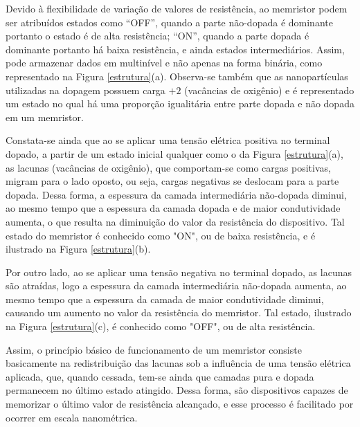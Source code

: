 \documentclass{ceel}
\begin{document}
\begin{multicols}{2}
Devido à flexibilidade de variação de valores de resistência, ao memristor podem ser atribuídos estados como “OFF”, quando a parte não-dopada é dominante portanto o estado é de alta resistência; “ON”, quando a parte dopada é dominante portanto há baixa resistência, e ainda estados intermediários. Assim, pode armazenar dados em multinível e não apenas na forma binária, como representado na Figura \ref{estrutura}(a). Observa-se também que as nanopartículas utilizadas na dopagem possuem carga $+2$ (vacâncias de oxigênio) e é representado um estado no qual há uma proporção igualitária entre parte dopada e não dopada em um memristor. 

Constata-se ainda que ao se aplicar uma tensão elétrica positiva 
no terminal dopado, a partir de um estado inicial qualquer como o da Figura \ref{estrutura}(a), as lacunas (vacâncias de oxigênio), que comportam-se como cargas positivas, migram para o lado oposto, ou seja, cargas negativas se deslocam para a parte dopada.
 Dessa forma, a espessura da camada intermediária não-dopada diminui, ao mesmo tempo que a espessura da camada dopada e de maior condutividade aumenta, o que resulta na diminuição do valor da resistência do dispositivo. Tal estado do memristor é conhecido como "ON", ou de baixa resistência, e é ilustrado na Figura \ref{estrutura}(b). 

Por outro lado, ao se aplicar uma tensão negativa no terminal dopado, as lacunas são atraídas, logo a espessura da camada intermediária não-dopada aumenta, ao mesmo tempo que a espessura da camada de maior condutividade diminui, causando um aumento no valor da resistência do memristor. Tal estado, ilustrado na Figura \ref{estrutura}(c), é conhecido como "OFF", ou de alta resistência. 

Assim, o princípio básico de funcionamento de um memristor consiste basicamente na redistribuição das lacunas sob a influência de uma tensão elétrica aplicada, que, quando cessada, tem-se ainda que camadas pura e dopada permanecem no último estado atingido. Dessa forma, são dispositivos capazes de memorizar o último valor de resistência alcançado, e esse processo é facilitado por ocorrer em escala nanométrica. %


\end{multicols}
\end{document}
